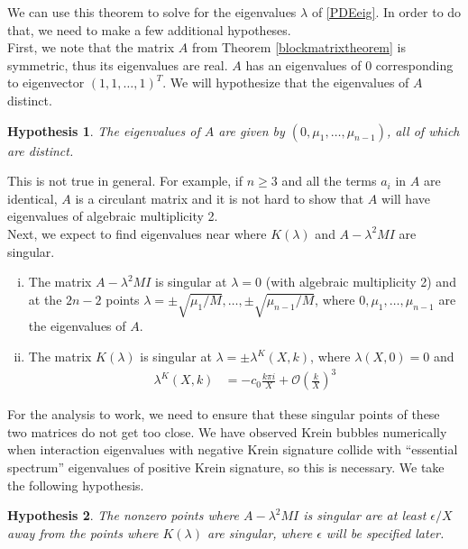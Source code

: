 \documentclass[12pt]{article}
\newtheorem{hypothesis}{Hypothesis}
\begin{document}
We can use this theorem to solve for the eigenvalues $\lambda$ of \eqref{PDEeig}. In order to do that, we need to make a few additional hypotheses.\\

First, we note that the matrix $A$ from Theorem \ref{blockmatrixtheorem} is symmetric, thus its eigenvalues are real. $A$ has an eigenvalues of 0 corresponding to eigenvector $(1, 1, \dots, 1)^T$. We will hypothesize that the eigenvalues of $A$ distinct. 

\begin{hypothesis}\label{Adistincteigs}
The eigenvalues of $A$ are given by $(0, \mu_1, \dots, \mu_{n-1})$, all of which are distinct.
\end{hypothesis}

This is not true in general. For example, if $n \geq 3$ and all the terms $a_i$ in $A$ are identical, $A$ is a circulant matrix and it is not hard to show that $A$ will have eigenvalues of algebraic multiplicity 2.\\

Next, we expect to find eigenvalues near where $K(\lambda)$ and $A - \lambda^2 MI$ are singular. 

\begin{enumerate}[(i)]
	\item The matrix $A - \lambda^2 M I$ is singular at $\lambda = 0$ (with algebraic multiplicity 2) and at the $2n-2$ points $\lambda = \pm \sqrt{\mu_1/M}, \dots, \pm \sqrt{\mu_{n-1}/M}$, where $0, \mu_1, \dots, \mu_{n-1}$ are the eigenvalues of $A$. 

	\item The matrix $K(\lambda)$ is singular at $\lambda = \pm \lambda^K(X,k)$, where $\lambda(X, 0) = 0$ and
	\begin{align}\label{lambdaXk}
	\lambda^K(X,k)
		&= -c_0 \frac{k \pi i }{X} + \mathcal{O}\left(\frac{k}{X}\right)^3 
	\end{align}
\end{enumerate}  

For the analysis to work, we need to ensure that these singular points of these two matrices do not get too close. We have observed Krein bubbles numerically when interaction eigenvalues with negative Krein signature collide with ``essential spectrum'' eigenvalues of positive Krein signature, so this is necessary. We take the following hypothesis.

\begin{hypothesis}\label{epsilonballs}
The nonzero points where $A - \lambda^2 MI$ is singular are at least $\epsilon/X$ away from the points where $K(\lambda)$ are singular, where $\epsilon$ will be specified later.
\end{hypothesis}
\end{document}
